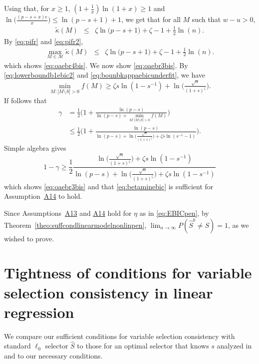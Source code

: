 \documentclass[bj,authoryear]{imsart}
\theoremstyle{plain}
\newcommand{\M}{\mathcal{M}}
\begin{document}
Using that, for $x\geq 1$, $(1+\frac{1}{x})\ln(1+x)\geq 1$ and $\ln\Big(\frac{(p-s+x)e}{x}\Big)\leq \ln(p-s+1)+1$, we get that for all $M$ such that $w-u>0$,
\begin{eqnarray}\label{eq:pifr2}
     \tilde{\kappa}(M) &\leq& \zeta\ln\big(p-s+1\big)+\zeta-1+\frac{1}{2}\ln(n).
 \end{eqnarray}
By \eqref{eq:pifr} and \eqref{eq:pifr2},
 \begin{eqnarray*}
     \max_{M\in\M}\tilde{\kappa}(M)  &\leq& \zeta\ln\big(p-s+1\big)+\zeta-1+\frac{1}{2}\ln(n).
 \end{eqnarray*}
which shows \eqref{eq:oaebr4bis}. We now show \eqref{eq:oaebr3bis}. By \eqref{eq:lowerboundb1ebic2} and \eqref{eq:bounbkappaebicunderfit}, we have
$$\min_{M: |M\setminus S|>0}f(M) \geq \zeta s\ln(1-s^{-1})+ \ln \big(\tfrac{\sqrt{n}}{(1+s)^{\zeta}}\big).$$
If follows that
 \begin{align*}
 \gamma&=\frac12\Big(1+\frac{\ln(p-s)}{\ln(p-s)+\min_{M: |M\setminus S|>0}f(M)}\Big) \\&\leq \frac12\Big(1+\frac{\ln(p-s)}{\ln(p-s)+ \ln \big(\tfrac{\sqrt{n}}{(1+s)^{\zeta}}\big)+\zeta s\ln(s^{-1}-1)}\Big).
 \end{align*}
 Simple algebra gives
  \begin{equation*}
 1-\gamma\geq \frac12\frac{ \ln \big(\tfrac{\sqrt{n}}{(1+s)^{\zeta}}\big)+\zeta s\ln(1-s^{-1})}{\ln(p-s)+ \ln \big(\tfrac{\sqrt{n}}{(1+s)^{\zeta}}\big)+\zeta s\ln(1-s^{-1})}
 \end{equation*}
 which shows \eqref{eq:oaebr3bis} and that \eqref{eq:betaminebic} is sufficient for  Assumption~\hyperlink{lab:A14}{A14} to hold.
 
 Since Assumptions~\hyperlink{lab:A13}{A13} and \hyperlink{lab:A14}{A14} hold for $\eta$ as in \eqref{eq:EBICpen}, by Theorem~\ref{theo:suffcondlinearmodelnonlinpen}, $\lim_{n\to\infty}P(\hat{S}^{b}\neq S)= 1$, as we wished to prove.


\section{Tightness of conditions for variable selection consistency in linear regression}\label{suppsec:tightness}

We compare our sufficient conditions for variable selection consistency with standard $\ell_0$ selector $\hat{S}$ to those for an optimal selector that knows $s$ analyzed in \cite{infotheowainwright} and to our necessary conditions.
\end{document}
